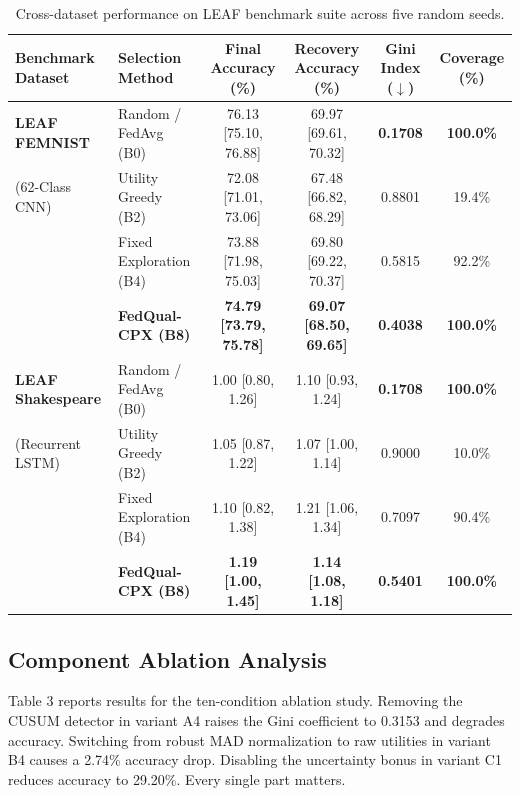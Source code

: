 \documentclass[conference]{IEEEtran}
\begin{document}
\begin{table}[t]
\caption{Cross-dataset performance on LEAF benchmark suite across five random seeds.}
\label{tab:leaf_benchmarks}
\centering
\begin{tabular}{llcccc}
\toprule
\textbf{Benchmark Dataset} & \textbf{Selection Method} & \textbf{Final Accuracy (\%)} & \textbf{Recovery Accuracy (\%)} & \textbf{Gini Index ($\downarrow$)} & \textbf{Coverage (\%)} \\
\midrule
\textbf{LEAF FEMNIST} & Random / FedAvg (B0) & 76.13 [75.10, 76.88] & 69.97 [69.61, 70.32] & \textbf{0.1708} & \textbf{100.0\%} \\
(62-Class CNN) & Utility Greedy (B2) & 72.08 [71.01, 73.06] & 67.48 [66.82, 68.29] & 0.8801 & 19.4\% \\
& Fixed Exploration (B4) & 73.88 [71.98, 75.03] & 69.80 [69.22, 70.37] & 0.5815 & 92.2\% \\
& \textbf{FedQual-CPX (B8)} & \textbf{74.79 [73.79, 75.78]} & \textbf{69.07 [68.50, 69.65]} & \textbf{0.4038} & \textbf{100.0\%} \\
\midrule
\textbf{LEAF Shakespeare} & Random / FedAvg (B0) & 1.00 [0.80, 1.26] & 1.10 [0.93, 1.24] & \textbf{0.1708} & \textbf{100.0\%} \\
(Recurrent LSTM) & Utility Greedy (B2) & 1.05 [0.87, 1.22] & 1.07 [1.00, 1.14] & 0.9000 & 10.0\% \\
& Fixed Exploration (B4) & 1.10 [0.82, 1.38] & 1.21 [1.06, 1.34] & 0.7097 & 90.4\% \\
& \textbf{FedQual-CPX (B8)} & \textbf{1.19 [1.00, 1.45]} & \textbf{1.14 [1.08, 1.18]} & \textbf{0.5401} & \textbf{100.0\%} \\
\bottomrule
\end{tabular}
\end{table}

\subsection{Component Ablation Analysis}
Table 3 reports results for the ten-condition ablation study. Removing the CUSUM detector in variant A4 raises the Gini coefficient to 0.3153 and degrades accuracy. Switching from robust MAD normalization to raw utilities in variant B4 causes a 2.74\% accuracy drop. Disabling the uncertainty bonus in variant C1 reduces accuracy to 29.20\%. Every single part matters.
\end{document}
